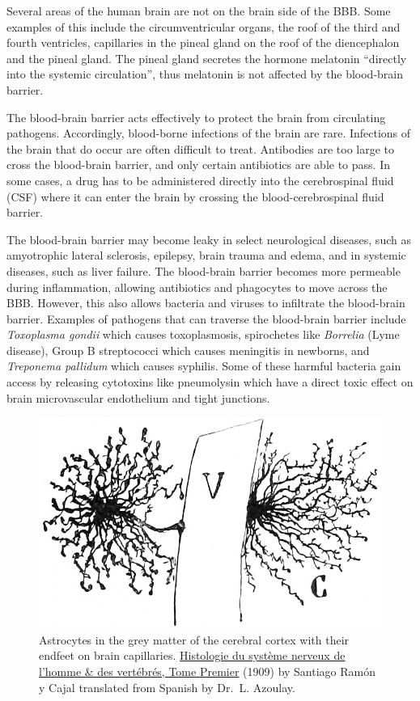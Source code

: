 Several areas of the human brain are not on the brain side of the BBB. Some examples of this include the circumventricular organs, the roof of the third and fourth ventricles, capillaries in the pineal gland on the roof of the diencephalon and the pineal gland. The pineal gland secretes the hormone melatonin ``directly into the systemic circulation'', thus melatonin is not affected by the blood-brain barrier.

The blood-brain barrier acts effectively to protect the brain from circulating pathogens. Accordingly, blood-borne infections of the brain are rare. Infections of the brain that do occur are often difficult to treat. Antibodies are too large to cross the blood-brain barrier, and only certain antibiotics are able to pass. In some cases, a drug has to be administered directly into the cerebrospinal fluid (CSF) where it can enter the brain by crossing the blood-cerebrospinal fluid barrier.

The blood-brain barrier may become leaky in select neurological diseases, such as amyotrophic lateral sclerosis, epilepsy, brain trauma and edema, and in systemic diseases, such as liver failure. The blood-brain barrier becomes more permeable during inflammation, allowing antibiotics and phagocytes to move across the BBB. However, this also allows bacteria and viruses to infiltrate the blood-brain barrier. Examples of pathogens that can traverse the blood-brain barrier include \emph{Toxoplasma gondii} which causes toxoplasmosis, spirochetes like \emph{Borrelia} (Lyme disease), Group B streptococci which causes meningitis in newborns, and \emph{Treponema pallidum} which causes syphilis. Some of these harmful bacteria gain access by releasing cytotoxins like pneumolysin which have a direct toxic effect on brain microvascular endothelium and tight junctions.



\begin{figure}

{\centering \includegraphics[width=0.7\linewidth]{./figures/cns/astrocytes_vessel} 

}

\caption{Astrocytes in the grey matter of the cerebral cortex with their endfeet on brain capillaries. \href{https://wellcomelibrary.org/item/b2129592x\#?c=0\&m=0\&s=0\&cv=14\&z=0\%2C-3.48\%2C1\%2C8.6591}{Histologie du système nerveux de l'homme \& des vertébrés, Tome Premier} (1909) by Santiago Ramón y Cajal translated from Spanish by Dr.~L. Azoulay.}\label{fig:astrobbb}
\end{figure}



